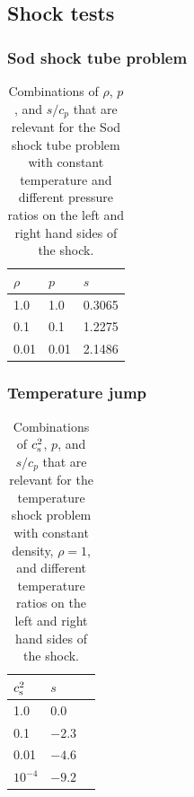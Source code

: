 \documentclass[\mydriver,12pt,twoside,notitlepage,a4paper]{article}
\begin{document}

\subsection{Shock tests}

\subsubsection{Sod shock tube problem}

\begin{table}[htb]
  \begin{center}
    \caption{
        Combinations of $\rho$, $p$, and $s/c_p$ that are relevant
        for the Sod shock tube problem with constant temperature
        and different pressure ratios on the left and right hand
        sides of the shock.
    }
    \label{Tshock1}
    \begin{tabular}{lll}
    \toprule
$\rho$  &  $p$  &  $s$  \\
    \midrule
   1.0  &  1.0  &  0.3065  \\
   0.1  &  0.1  &  1.2275  \\
   0.01 &  0.01 &  2.1486  \\
    \bottomrule
    \end{tabular}
  \end{center}
\end{table}

\subsubsection{Temperature jump}

\begin{table}[htb]
  \begin{center}
    \caption{
        Combinations of $c_{\rm s}^2$, $p$, and $s/c_p$ that are
        relevant for the temperature shock problem with constant density,
        $\rho=1$, and different temperature ratios on the left and
        right hand sides of the shock.
    }
    \label{Tshock2}
    \begin{tabular}{lll}
    \toprule
$c_{\rm s}^2$  &  $s$  \\
    \midrule
   1.0    &$ 0.0$ \\
   0.1    &$-2.3$ \\
   0.01   &$-4.6$ \\
$10^{-4}$ &$-9.2$ \\
    \bottomrule
    \end{tabular}
  \end{center}
\end{table}
\end{document}
